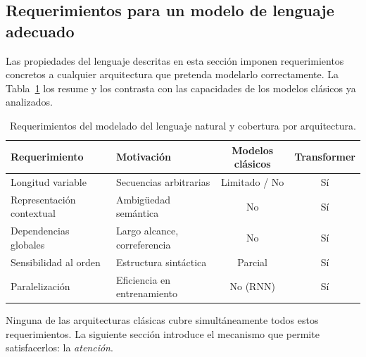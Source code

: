 \subsection{Requerimientos para un modelo de lenguaje adecuado}
\label{subsec:requerimientos}

Las propiedades del lenguaje descritas en esta sección imponen requerimientos
concretos a cualquier arquitectura que pretenda modelarlo correctamente.
La Tabla~\ref{tab:requerimientos_nlp} los resume y los contrasta con las
capacidades de los modelos clásicos ya analizados.

\begin{table}[H]
\centering
\caption{Requerimientos del modelado del lenguaje natural y cobertura por
arquitectura.}
\label{tab:requerimientos_nlp}
\begin{tabularx}{\textwidth}{lXcc}
\toprule
\textbf{Requerimiento} & \textbf{Motivación} & \textbf{Modelos clásicos} & \textbf{Transformer} \\
\midrule
Longitud variable        & Secuencias arbitrarias        & Limitado / No & Sí \\
Representación contextual & Ambigüedad semántica          & No            & Sí \\
Dependencias globales    & Largo alcance, correferencia  & No            & Sí \\
Sensibilidad al orden    & Estructura sintáctica         & Parcial       & Sí \\
Paralelización           & Eficiencia en entrenamiento   & No (RNN)      & Sí \\
\bottomrule
\end{tabularx}
\end{table}

Ninguna de las arquitecturas clásicas cubre simultáneamente todos estos
requerimientos. La siguiente sección introduce el mecanismo que permite
satisfacerlos: la \textit{atención}.
